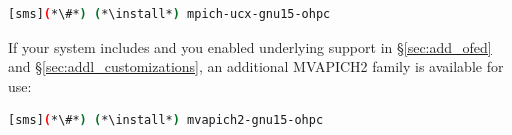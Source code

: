 \begin{lstlisting}[language=bash]
[sms](*\#*) (*\install*) mpich-ucx-gnu15-ohpc
\end{lstlisting}

If your system includes \InfiniBand{} and you enabled underlying support in
\S\ref{sec:add_ofed} and \S\ref{sec:addl_customizations}, an additional
MVAPICH2 family is available for use:

\begin{lstlisting}[language=bash]
[sms](*\#*) (*\install*) mvapich2-gnu15-ohpc
\end{lstlisting}
